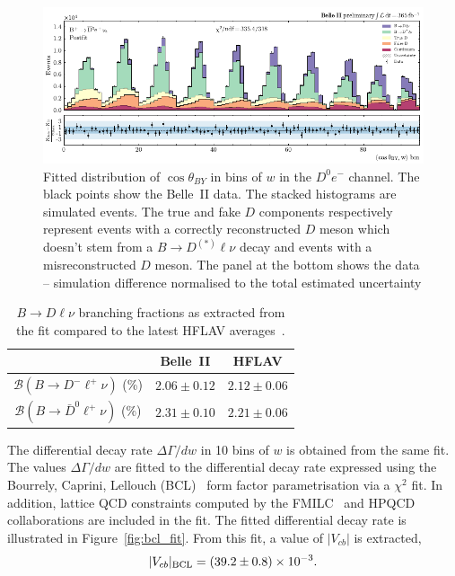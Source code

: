 \documentclass{moriond}
\def\vcb{V_{cb}}
\def\btodlnu{B \to D\ell\nu}
\def\costby{\cos\theta_{BY}}
\begin{document}
\begin{figure}[h!]
    \centering
    \includegraphics[scale=0.9]{2d_fit.pdf}
    \caption{Fitted distribution of $\costby$ in bins of $w$ in the $D^0e^-$ channel. The black points show the Belle~II data. The stacked histograms are simulated events. The true and fake $D$ components respectively represent events with a correctly reconstructed $D$ meson which doesn't stem from a $B \to D^{(*)} \ell \nu$ decay and events with a misreconstructed $D$ meson. The panel at the bottom shows the data -- simulation difference normalised to the total estimated uncertainty}
    \label{fig:2d_fit}
\end{figure}
\begin{table}[h!]
    \centering
    \caption{$\btodlnu$ branching fractions as extracted from the fit compared to the latest HFLAV averages~\cite{hflav}.}
    \begin{tabular}{|c c c|}
         \hline
         & Belle~II & HFLAV \\
         \hline
        $\mathcal{B}(B \to D^- \ell^+ \nu)$ (\%) & $2.06 \pm 0.12$ & $2.12 \pm 0.06$ \\
        $\mathcal{B}(B \to \bar{D}^0 \ell^+ \nu)$ (\%) & $2.31 \pm 0.10$ & $2.21 \pm 0.06$ \\
         \hline
    \end{tabular}
    \label{tab:br}
\end{table}
The differential decay rate $\Delta\Gamma/dw$ in 10 bins of $w$ is obtained from the same fit. The values $\Delta\Gamma/dw$ are fitted to the differential decay rate expressed using the Bourrely, Caprini, Lellouch (BCL)~\cite{bcl} form factor parametrisation via a $\chi^2$ fit. In addition, lattice QCD constraints computed by the FMILC~\cite{fmilc} and HPQCD~\cite{hpqcd} collaborations are included in the fit. The fitted differential decay rate is illustrated in Figure~\ref{fig:bcl_fit}. From this fit, a value of $|\vcb|$ is extracted,
\begin{equation}
    |\vcb|_{\rm BCL} = (39.2 \pm 0.8) \times 10^{-3}.
\end{equation}
\end{document}
